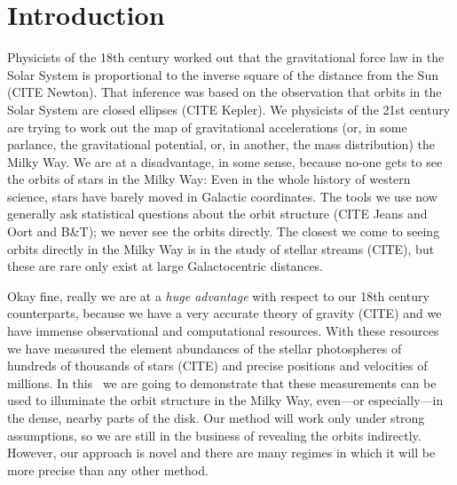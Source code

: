 \documentclass[modern]{aastex63}
\begin{document}

\section*{}\clearpage

\section{Introduction}

Physicists of the 18th century worked out that the gravitational force
law in the Solar System is proportional to the inverse square of the
distance from the Sun (CITE Newton).
That inference was based on the observation that orbits in the Solar
System are closed ellipses (CITE Kepler).
We physicists of the 21st century are trying to work out the map of
gravitational accelerations (or, in some parlance, the gravitational
potential, or, in another, the mass distribution)  the Milky Way.
We are at a disadvantage, in some sense, because no-one gets to see
the orbits of stars in the Milky Way: Even in the whole history of
western science, stars have barely moved in Galactic coordinates.
The tools we use now generally ask statistical questions about the
orbit structure (CITE Jeans and Oort and B\&T); we never see the orbits directly.
The closest we come to seeing orbits directly in the Milky Way is in the
study of stellar streams (CITE), but these are rare only exist at large
Galactocentric distances.

Okay fine, really we are at a \emph{huge advantage} with respect to
our 18th century counterparts, because we have a very accurate theory
of gravity (CITE) and we have immense observational and computational
resources.
With these resources we have measured the element abundances of the
stellar photospheres of hundreds of thousands of stars (CITE) and
precise positions and velocities of millions.
In this \documentname\ we are going to demonstrate that these
measurements can be used to illuminate the orbit structure in the
Milky Way, even---or especially---in the dense, nearby parts of the
disk.
Our method will work only under strong assumptions, so we are
still in the business of revealing the orbits indirectly.
However, our approach is novel and there are many regimes in which it
will be more precise than any other method.
\end{document}
